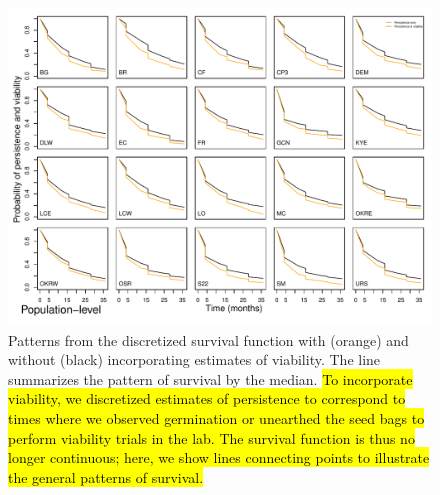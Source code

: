 \documentclass[12pt, oneside]{article}   	%
\begin{document}
 \begin{figure}[!h]
   \centering
       \includegraphics[page=1,width=1\textwidth]{../../figures/survival-function-persistence-viability.pdf}  
    \caption{ Patterns from the discretized survival function with (orange) and without (black) incorporating estimates of viability. The line summarizes the pattern of survival by the median. \hl{To incorporate viability, we discretized estimates of persistence to correspond to times where we observed germination or unearthed the seed bags to perform viability trials in the lab. The survival function is thus no longer continuous; here, we show lines connecting points to illustrate the general patterns of survival.} }
 \label{fig:viability-estimates-population}
\end{figure}
\end{document}
